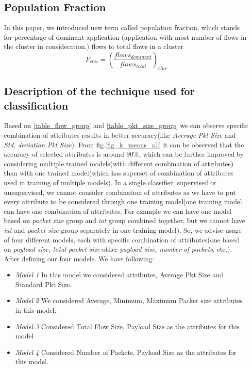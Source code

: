 \documentclass[conference]{IEEEtran}
\begin{document}
\subsection{Population Fraction}
In this paper, we introduced new term called population fraction, which stands for percentage of dominant application (application with most number of flows in the cluster in consideration.) flows to total flows in a cluster
\begin{equation}
P_{clus} = (\frac{flows_{dominant}}{flows_{total}})_{clus}
\end{equation}
\subsection{Description of the technique used for classification}
Based on \ref{table_flow_group} and \ref{table_pkt_size_group} we can observe specific combination of attributes results in better accuracy(like \emph{Average Pkt Size} and \emph{Std. deviation Pkt Size}). From fig.\ref{fig_k_means_all} it can be observed that the accuracy of selected attributes is around 90\%, which can be further improved by considering multiple trained models(with different combination of attributes) than with one trained model(which has superset of combination of attributes used in training of multiple models). In a single classifier, supervised or unsupervised, we cannot consider combination of attributes as we have to put every attribute to be considered through one training model(one training model can have one combination of attributes. For example we can have one model based on \emph{packet size} group and \emph{iat} group combined together, but we cannot have \emph{iat} and \emph{packet size} group separately in one training model). So, we advise usage of four different models, each with specific combination of attributes(one based on \emph{payload size, total packet size} other \emph{payload size, number of packets}, etc.).
After defining our four models. We have following:
\begin{itemize}
	\item \emph{Model 1}
	In this model we considered attributes, Average Pkt Size and Standard Pkt Size.
	\item \emph{Model 2}
	We considered Average, Minimum, Maximum Packet size attributes in this model.
	\item \emph{Model 3}
	Considered Total Flow Size, Payload Size as the attributes for this model
	\item \emph{Model 4}
	Considered Number of Packets, Payload Size as the attributes for this model.
\end{itemize}
\end{document}
